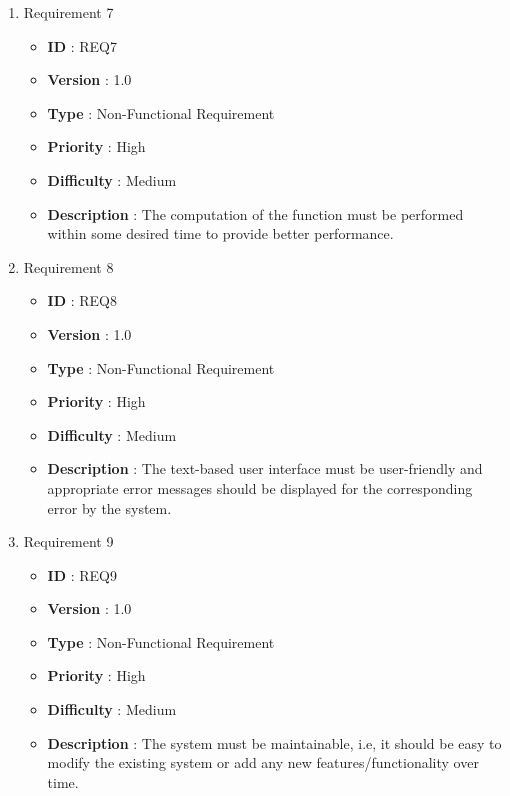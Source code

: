 \documentclass[12pt, a4paper]{article}
\begin{document}
\begin{enumerate}
 
    
     
    \item{} Requirement 7
        \begin{itemize}
        \item \textbf{ID} : REQ7
        \item \textbf{Version} : 1.0
        \item \textbf{Type} : Non-Functional Requirement
        \item \textbf{Priority} : High
        \item \textbf{Difficulty} : Medium
        \item \textbf{Description} : The computation of the function must be performed within some desired time to provide better performance.
        \end{itemize}
    
    \item{} Requirement 8
        \begin{itemize}
        \item \textbf{ID} : REQ8
        \item \textbf{Version} : 1.0
        \item \textbf{Type} : Non-Functional Requirement
        \item \textbf{Priority} : High
        \item \textbf{Difficulty} : Medium
        \item \textbf{Description} : The text-based user interface must be user-friendly and appropriate error messages should be displayed for the corresponding error by the system.
        \end{itemize}
    
    \item{} Requirement 9
        \begin{itemize}
        \item \textbf{ID} : REQ9
        \item \textbf{Version} : 1.0
        \item \textbf{Type} : Non-Functional Requirement
        \item \textbf{Priority} : High
        \item \textbf{Difficulty} : Medium
        \item \textbf{Description} : The system must be maintainable, i.e, it should be easy to modify the existing system or add any new features/functionality over time.
        \end{itemize}
    
\end{enumerate}
\end{document}
